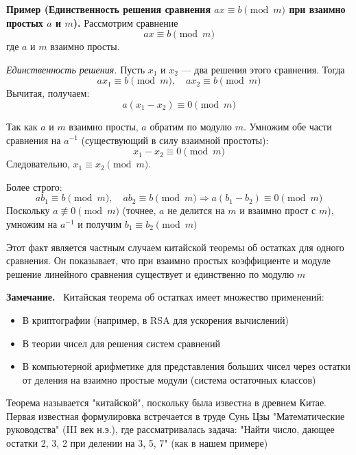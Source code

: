 \documentclass[a4paper,12pt]{article}
\newcommand{\myremark}{\textbf{Замечание.}\ }
\theoremstyle{definition}
\theoremstyle{plain}
\theoremstyle{remark}
\begin{document}
	\noindent \textbf{Пример (Единственность решения сравнения $ax \equiv b \pmod{m}$ при взаимно простых $a$ и $m$).}
	Рассмотрим сравнение
	\[
	ax \equiv b \pmod{m}
	\]
	где $a$ и $m$ взаимно просты.
	
	\textit{Единственность решения.}
	Пусть $x_1$ и $x_2$ — два решения этого сравнения. Тогда
	\[
	ax_1 \equiv b \pmod{m}, \quad ax_2 \equiv b \pmod{m}
	\]
	Вычитая, получаем:
	\[
	a(x_1 - x_2) \equiv 0 \pmod{m}
	\]
	
	Так как $a$ и $m$ взаимно просты, $a$ обратим по модулю $m$. Умножим обе части сравнения на $a^{-1}$ (существующий в силу взаимной простоты):
	\[
	x_1 - x_2 \equiv 0 \pmod{m}
	\]
	Следовательно, $x_1 \equiv x_2 \pmod{m}$.
	
	Более строго:
	\[
	ab_1 \equiv b \pmod{m}, \quad ab_2 \equiv b \pmod{m} \Rightarrow a(b_1 - b_2) \equiv 0 \pmod{m}
	\]
	Поскольку $a \not\equiv 0 \pmod{m}$ (точнее, $a$ не делится на $m$ и взаимно прост с $m$), умножим на $a^{-1}$ и получим $b_1 \equiv b_2 \pmod{m}$
	
	\begin{tcolorbox}[colback=blue!5, colframe=blue!40!black, title=Замечание]
		Этот факт является частным случаем китайской теоремы об остатках для одного сравнения. Он показывает, что при взаимно простых коэффициенте и модуле решение линейного сравнения существует и единственно по модулю $m$
	\end{tcolorbox}
	
	\myremark
	Китайская теорема об остатках имеет множество применений:
	\begin{itemize}
		\item В криптографии (например, в RSA для ускорения вычислений)
		\item В теории чисел для решения систем сравнений
		\item В компьютерной арифметике для представления больших чисел через остатки от деления на взаимно простые модули (система остаточных классов)
	\end{itemize}
	
	\begin{tcolorbox}[colback=purple!5, colframe=purple!50!black, title=Заметочка: Название]
		Теорема называется "китайской", поскольку была известна в древнем Китае. Первая известная формулировка встречается в труде Сунь Цзы "Математические руководства" (III век н.э.), где рассматривалась задача: "Найти число, дающее остатки 2, 3, 2 при делении на 3, 5, 7" (как в нашем примере)
	\end{tcolorbox}
	
\end{document}
